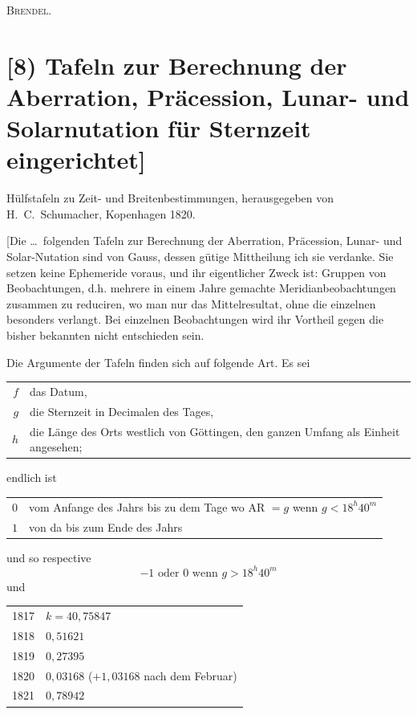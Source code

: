 \documentclass[12pt,a4paper]{article}
\theoremstyle{plain}
\theoremstyle{definition}
\theoremstyle{remark}
\begin{document}
\hfill\textsc{Brendel}.

\newpage

\section*{[8) Tafeln zur Berechnung der Aberration, Pr\"acession, Lunar- und Solarnutation f\"ur Sternzeit eingerichtet]}

H\"ulfstafeln zu Zeit- und Breitenbestimmungen, herausgegeben von H.\ C.\ Schumacher, Kopenhagen 1820.

[Die \ldots\ folgenden Tafeln zur Berechnung der Aberration, Pr\"acession, Lunar- und Solar-Nutation sind von Gauss, dessen g\"utige Mittheilung ich sie verdanke. Sie setzen keine Ephemeride voraus, und ihr eigentlicher Zweck ist: Gruppen von Beobachtungen, d.h. mehrere in einem Jahre gemachte Meridianbeobachtungen zusammen zu reduciren, wo man nur das Mittelresultat, ohne die einzelnen besonders verlangt. Bei einzelnen Beobachtungen wird ihr Vortheil gegen die bisher bekannten nicht entschieden sein.

Die Argumente der Tafeln finden sich auf folgende Art. Es sei
\begin{center}
\begin{tabular}{r@{\ldots\ }l}
$f$ & das Datum, \\
$g$ & die Sternzeit in Decimalen des Tages, \\
$h$ & die L\"ange des Orts westlich von G\"ottingen, den ganzen Umfang als Einheit angesehen;
\end{tabular}
\end{center}
endlich ist
\begin{center}
\begin{tabular}{c@{\quad}l}
$0$ & vom Anfange des Jahrs bis zu dem Tage wo AR $= g$ wenn $g < 18^h40^m$ \\
$1$ & von da bis zum Ende des Jahrs
\end{tabular}
\end{center}
und so respective
\[
-1 \text{ oder } 0 \text{ wenn } g > 18^h40^m
\]
und
\begin{center}
\begin{tabular}{r@{\quad}l}
1817 & $k = 40{,}75847$ \\
1818 & $0{,}51621$ \\
1819 & $0{,}27395$ \\
1820 & $0{,}03168$ ($+1{,}03168$ nach dem Februar) \\
1821 & $0{,}78942$
\end{tabular}
\end{center}
\end{document}
